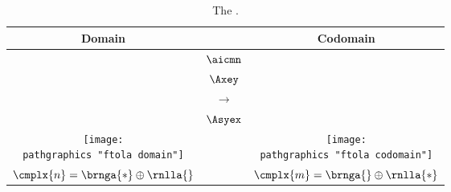 \begin{table}[t]
	\begin{center}
		\begin{tabular}{ccc}
		  Domain && Codomain\\\hline
		  & $\aicmn$ \\[10pt]
		  & $\Axey$ \\
		  & $\longrightarrow$ \\
		  & $\Asyex$ \\
		  \texttt{[image: \\pathgraphics "ftola domain"]} &&
		  \texttt{[image: \\pathgraphics "ftola codomain"]} \\
		  $\cmplx{n} = \brnga{*} \oplus \rnlla{}$ && $\cmplx{m} = \brnga{} \oplus \rnlla{*}$		\\[10pt]		  %
    \end{tabular}
	\end{center}
	\caption{The \ftola.}
	\label{tab:ftola diagram}
\end{table}%

\endinput  %